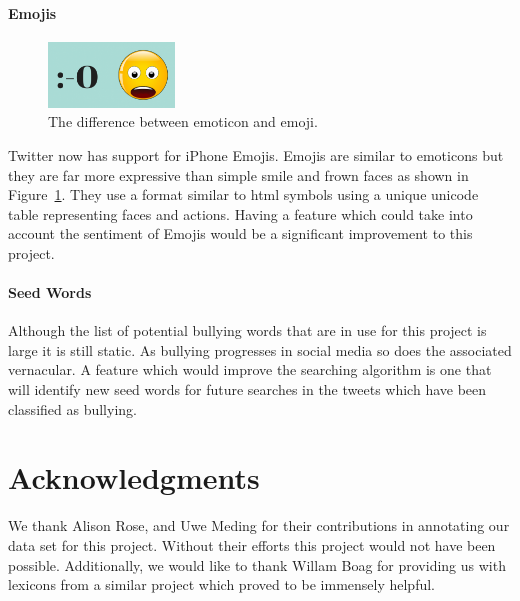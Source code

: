 \documentclass[11pt,letterpaper]{article}
\begin{document}
\paragraph{Emojis}
\begin{figure}[h!]
\label{emoji-figure} 
  \caption{The difference between emoticon and emoji.}
  \centering
    \includegraphics[width=0.3\textwidth]{emoji}
\end{figure}
Twitter now has support for iPhone Emojis. Emojis are similar to emoticons but they are far more expressive than simple smile and frown faces as shown in Figure~\ref{emoji-figure}. They use a format similar to html symbols using a unique unicode table representing faces and actions. Having a feature which could take into account the sentiment of Emojis would be a significant improvement to this project.
\paragraph{Seed Words}
Although the list of potential bullying words that are in use for this project is large it is still static. As bullying progresses in social media so does the associated vernacular. A feature which would improve the searching algorithm is one that will identify new seed words for future searches in the tweets which have been classified as bullying.


\section*{Acknowledgments}
We thank Alison Rose, and Uwe Meding for their contributions in annotating our data set for this project. Without their efforts this project would not have been possible.
Additionally, we would like to thank Willam Boag for providing us with lexicons from a similar project which proved to be immensely helpful.





\end{document}
